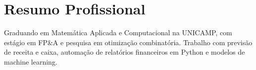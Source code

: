 \resumeheader

\section{Resumo Profissional}
\resumeSubHeadingListStart
    \item \small{Graduando em Matemática Aplicada e Computacional na UNICAMP, com estágio em FP\&A e pesquisa em otimização combinatória. Trabalho com previsão de receita e caixa, automação de relatórios financeiros em Python e modelos de machine learning.}
\resumeSubHeadingListEnd

